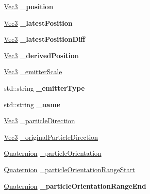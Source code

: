 \begin{DoxyCompactItemize}
\item 
\mbox{\label{classPUEmitter_a5996d2b7e933b6b84c5c79506fa4a732}} 
\hyperlink{classVec3}{Vec3} {\bfseries \+\_\+position}
\item 
\mbox{\label{classPUEmitter_af27f9b226bb73e6c77f9c21e1a25d45c}} 
\hyperlink{classVec3}{Vec3} {\bfseries \+\_\+latest\+Position}
\item 
\mbox{\label{classPUEmitter_ae47f0de1bbee110b10724c513970469e}} 
\hyperlink{classVec3}{Vec3} {\bfseries \+\_\+latest\+Position\+Diff}
\item 
\mbox{\label{classPUEmitter_a9823bd687ecb5427fc07a2de23ffb4d2}} 
\hyperlink{classVec3}{Vec3} {\bfseries \+\_\+derived\+Position}
\item 
\hyperlink{classVec3}{Vec3} \hyperlink{classPUEmitter_a950d7644bf868952d1372ea316c16b04}{\+\_\+emitter\+Scale}
\item 
\mbox{\label{classPUEmitter_a640e63f126e828671141dc48201082dc}} 
std\+::string {\bfseries \+\_\+emitter\+Type}
\item 
\mbox{\label{classPUEmitter_af3c2a940f82961d1acc3730025a305d7}} 
std\+::string {\bfseries \+\_\+name}
\item 
\hyperlink{classVec3}{Vec3} \hyperlink{classPUEmitter_a0499f306a39420300565df42c5d20459}{\+\_\+particle\+Direction}
\item 
\hyperlink{classVec3}{Vec3} \hyperlink{classPUEmitter_a2d62eec11cd9017310507096f631379f}{\+\_\+original\+Particle\+Direction}
\item 
\hyperlink{classQuaternion}{Quaternion} \hyperlink{classPUEmitter_a2b4c7199635cd089a5bc019be5ee262b}{\+\_\+particle\+Orientation}
\item 
\hyperlink{classQuaternion}{Quaternion} \hyperlink{classPUEmitter_aa2cc6ae3bf6edf47a76ac6787406ba79}{\+\_\+particle\+Orientation\+Range\+Start}
\item 
\mbox{\label{classPUEmitter_a5a805b9c78fa35ff27aaf84bf8f91929}} 
\hyperlink{classQuaternion}{Quaternion} {\bfseries \+\_\+particle\+Orientation\+Range\+End}
\item 

\end{DoxyCompactItemize}
